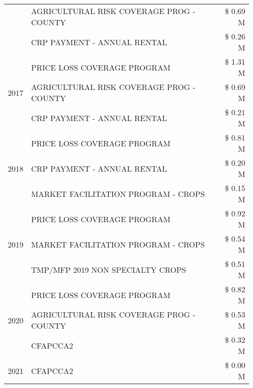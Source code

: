 \begin{tabular}{llr}
 & AGRICULTURAL RISK COVERAGE PROG - COUNTY      & \$ 0.69 M \\
 & CRP PAYMENT - ANNUAL RENTAL                   & \$ 0.26 M \\
\cline{1-3}
\multirow[t]{3}{*}{2017} & PRICE LOSS COVERAGE PROGRAM & \$ 1.31 M \\
 & AGRICULTURAL RISK COVERAGE PROG - COUNTY & \$ 0.69 M \\
 & CRP PAYMENT - ANNUAL RENTAL & \$ 0.21 M \\
\cline{1-3}
\multirow[t]{3}{*}{2018} & PRICE LOSS COVERAGE PROGRAM & \$ 0.81 M \\
 & CRP PAYMENT - ANNUAL RENTAL & \$ 0.20 M \\
 & MARKET FACILITATION PROGRAM - CROPS & \$ 0.15 M \\
\cline{1-3}
\multirow[t]{3}{*}{2019} & PRICE LOSS COVERAGE PROGRAM & \$ 0.92 M \\
 & MARKET FACILITATION PROGRAM - CROPS & \$ 0.54 M \\
 & TMP/MFP 2019 NON SPECIALTY CROPS & \$ 0.51 M \\
\cline{1-3}
\multirow[t]{3}{*}{2020} & PRICE LOSS COVERAGE PROGRAM & \$ 0.82 M \\
 & AGRICULTURAL RISK COVERAGE PROG - COUNTY & \$ 0.53 M \\
 & CFAPCCA2 & \$ 0.32 M \\
\cline{1-3}
2021 & CFAPCCA2 & \$ 0.00 M \\
\cline{1-3}
\bottomrule
\end{tabular}
